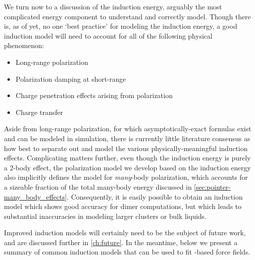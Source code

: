 We turn now to a discussion of the \sapt induction energy, arguably the most
complicated energy component to understand and correctly model. Though there
is, as of yet, no one `best practice' for modeling the \sapt induction energy, a good
induction model will need to account for all of the following physical phenomenon:
\begin{itemize}
\item Long-range polarization
\item Polarization damping at short-range
\item Charge penetration effects arising from polarization
\item Charge transfer
\end{itemize}
Aside from long-range polarization, for which asymptotically-exact formulas
exist and can be modeled in simulation,\cite{Rick2002,Holt2008,Misquitta2007a,Misquitta2008b} 
there is currently little literature consensus as how best to separate out and
model the various physically-meaningful induction effects. Complicating matters further,
even though the \sapt induction energy is purely a 2-body effect, the
polarization model we develop based on the induction energy also implicitly defines
the model for \emph{many}-body polarization, which accounts for a sizeable
fraction of the total many-body energy discussed in
\cref{sec:pointer-many_body_effects}.
Consequently, it is easily possible to obtain an induction model which shows good
accuracy for dimer computations, but which leads to substantial inaccuracies
in modeling larger clusters or bulk liquids.

Improved induction models will certainly need to be the subject of future work,
and are discussed further in \cref{ch:future}. In the meantime, below we present a summary of
common induction models that can be used to fit \sapt-based force fields.

